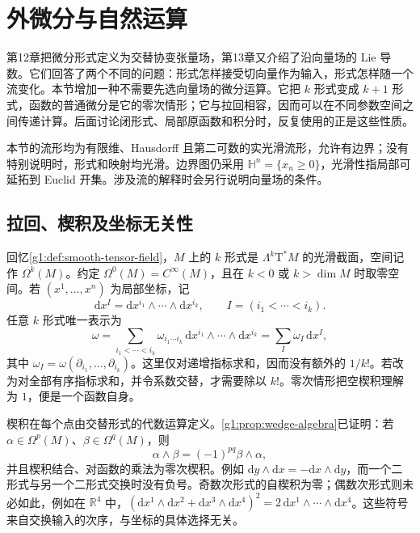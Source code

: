 
% 
% 

\section{外微分与自然运算}
\label{g1:sec:1401}

第12章把微分形式定义为交替协变张量场，第13章又介绍了沿向量场的 Lie 导数。它们回答了两个不同的问题：形式怎样接受切向量作为输入，形式怎样随一个流变化。本节增加一种不需要先选向量场的微分运算。它把 \(k\) 形式变成 \(k+1\) 形式，函数的普通微分是它的零次情形；它与拉回相容，因而可以在不同参数空间之间传递计算。后面讨论闭形式、局部原函数和积分时，反复使用的正是这些性质。

\ProseParagraphBreak

本节的流形均为有限维、Hausdorff 且第二可数的实光滑流形，允许有边界；没有特别说明时，形式和映射均光滑。边界图仍采用 \(\mathbb H^n=\{x_n\geq0\}\)，光滑性指局部可延拓到 Euclid 开集。涉及流的解释时会另行说明向量场的条件。

\subsection{拉回、楔积及坐标无关性}
\label{g1:subsec:1401:01}

回忆\cref{g1:def:smooth-tensor-field}，\(M\) 上的 \(k\) 形式是 \(\Lambda^k\mathrm{T}^*M\) 的光滑截面，空间记作 \(\Omega^k(M)\)。约定 \(\Omega^0(M)=C^\infty(M)\)，且在 \(k<0\) 或 \(k>\dim M\) 时取零空间。若 \((x^1,\ldots,x^n)\) 为局部坐标，记
\[
	\mathrm{d}x^I=\mathrm{d}x^{i_1}\wedge\cdots\wedge\mathrm{d}x^{i_k},\qquad I=(i_1<\cdots<i_k).
\]
任意 \(k\) 形式唯一表示为
\[
	\omega=\sum_{i_1<\cdots<i_k}\omega_{i_1\cdots i_k}\,\mathrm{d}x^{i_1}\wedge\cdots\wedge\mathrm{d}x^{i_k}
	=\sum_I\omega_I\,\mathrm{d}x^I,
\]
其中 \(\omega_I=\omega(\partial_{i_1},\ldots,\partial_{i_k})\)。这里仅对递增指标求和，因而没有额外的 \(1/k!\)。若改为对全部有序指标求和，并令系数交替，才需要除以 \(k!\)。零次情形把空楔积理解为 \(1\)，便是一个函数自身。

\ProseParagraphBreak

楔积在每个点由交替形式的代数运算定义。\cref{g1:prop:wedge-algebra}已证明：若 \(\alpha\in\Omega^p(M)\)、\(\beta\in\Omega^q(M)\)，则
\[
	\alpha\wedge\beta=(-1)^{pq}\beta\wedge\alpha,
\]
并且楔积结合、对函数的乘法为零次楔积。例如 \(\mathrm{d}y\wedge\mathrm{d}x=-\mathrm{d}x\wedge\mathrm{d}y\)，而一个二形式与另一个二形式交换时没有负号。奇数次形式的自楔积为零；偶数次形式则未必如此，例如在 \(\mathbb R^4\) 中，\((\mathrm{d}x^1\wedge\mathrm{d}x^2+\mathrm{d}x^3\wedge\mathrm{d}x^4)^2=2\,\mathrm{d}x^1\wedge\cdots\wedge\mathrm{d}x^4\)。这些符号来自交换输入的次序，与坐标的具体选择无关。

